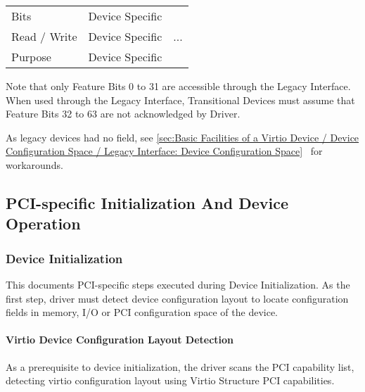 \begin{tabular}{|l||l|l|}
\hline
Bits & Device Specific & \multirow{3}{*}{...} \\
\cline{1-2}
Read / Write & Device Specific & \\
\cline{1-2}
Purpose & Device Specific & \\
\hline
\end{tabular}

Note that only Feature Bits 0 to 31 are accessible through the
Legacy Interface. When used through the Legacy Interface,
Transitional Devices must assume that Feature Bits 32 to 63
are not acknowledged by Driver.

As legacy devices had no  field,
see \ref{sec:Basic Facilities of a Virtio Device / Device
Configuration Space / Legacy Interface: Device Configuration
Space}~ for workarounds.

\subsection{PCI-specific Initialization And Device Operation}\label{sec:Virtio Transport Options / Virtio Over PCI Bus / PCI-specific Initialization And Device Operation}

\subsubsection{Device Initialization}\label{sec:Virtio Transport Options / Virtio Over PCI Bus / PCI-specific Initialization And Device Operation / Device Initialization}

This documents PCI-specific steps executed during Device Initialization.
As the first step, driver must detect device configuration layout
to locate configuration fields in memory, I/O or PCI configuration space of the
device.

\paragraph{Virtio Device Configuration Layout Detection}\label{sec:Virtio Transport Options / Virtio Over PCI Bus / PCI-specific Initialization And Device Operation / Device Initialization / Virtio Device Configuration Layout Detection}

As a prerequisite to device initialization, the driver scans the
PCI capability list, detecting virtio configuration layout using Virtio
Structure PCI capabilities.

